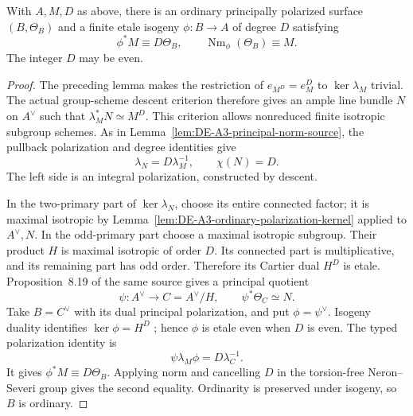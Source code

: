 \begin{lemma}
\label{lem:DE-A3-ordinary-etale-norm}
With $A,M,D$ as above, there is an ordinary principally polarized
surface $(B,\Theta_B)$ and a finite etale isogeny $\phi:B\to A$
of degree $D$ satisfying
\[
                 \phi^*M\equiv D\Theta_B,
                 \qquad \operatorname{Nm}_\phi(\Theta_B)\equiv M.
\]
The integer $D$ may be even.
\end{lemma}
\begin{proof}
The preceding lemma makes the restriction of $e_{M^D}=e_M^D$
to $\ker\lambda_M$ trivial.  The actual group-scheme descent
criterion \cite[Corollary~8.11 and proof, p.~117]
{EdixhovenVanDerGeerMoonenAV} therefore gives an ample line bundle
$N$ on $A^\vee$ such that $\lambda_M^*N\simeq M^D$.
This criterion allows nonreduced finite isotropic subgroup schemes.
As in Lemma~\ref{lem:DE-A3-principal-norm-source}, the pullback
polarization and degree identities give
\[
                       \lambda_N=D\lambda_M^{-1},
                       \qquad \chi(N)=D.
\]
The left side is an integral polarization, constructed by descent.

In the two-primary part of $\ker\lambda_N$, choose its entire
connected factor; it is maximal isotropic by
Lemma~\ref{lem:DE-A3-ordinary-polarization-kernel} applied to
$A^\vee,N$.  In the odd-primary part choose a maximal isotropic
subgroup.  Their product $H$ is maximal isotropic of order $D$.
Its connected part is multiplicative, and its remaining part has
odd order.  Therefore its Cartier dual $H^D$ is etale.
Proposition~8.19 of the same source gives a principal quotient
\[
               \psi:A^\vee\longrightarrow C=A^\vee/H,
               \qquad \psi^*\Theta_C\simeq N.
\]
Take $B=C^\vee$ with its dual principal polarization, and put
$\phi=\psi^\vee$.  Isogeny duality identifies
$\ker\phi=H^D$ \cite[Theorem~7.5, p.~100]
{EdixhovenVanDerGeerMoonenAV}; hence $\phi$ is etale even when
$D$ is even.  The typed polarization identity is
\[
                \psi\lambda_M\phi=D\lambda_C^{-1}.
\]
It gives $\phi^*M\equiv D\Theta_B$.  Applying norm and cancelling
$D$ in the torsion-free Neron--Severi group gives the second equality.
Ordinarity is preserved under isogeny, so $B$ is ordinary.
\end{proof}

